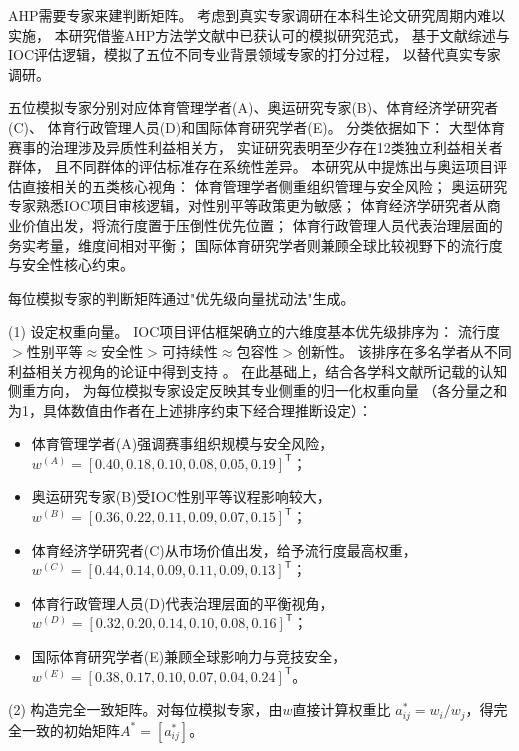 \documentclass[twoside]{CUGThesis}
\begin{document}
AHP需要专家来建判断矩阵。
考虑到真实专家调研在本科生论文研究周期内难以实施，
本研究借鉴AHP方法学文献中已获认可的模拟研究范式\cite{Zahedi1986,Carmone1997}，
基于文献综述与IOC评估逻辑，模拟了五位不同专业背景领域专家的打分过程，
以替代真实专家调研。

五位模拟专家分别对应体育管理学者(A)、奥运研究专家(B)、体育经济学研究者(C)、
体育行政管理人员(D)和国际体育研究学者(E)。
分类依据如下：
大型体育赛事的治理涉及异质性利益相关方，
实证研究表明至少存在12类独立利益相关者群体\cite{Parent2008}，
且不同群体的评估标准存在系统性差异。
本研究从中提炼出与奥运项目评估直接相关的五类核心视角：
体育管理学者侧重组织管理与安全风险；
奥运研究专家熟悉IOC项目审核逻辑，对性别平等政策更为敏感；
体育经济学研究者从商业价值出发，将流行度置于压倒性优先位置；
体育行政管理人员代表治理层面的务实考量，维度间相对平衡；
国际体育研究学者则兼顾全球比较视野下的流行度与安全性核心约束。

每位模拟专家的判断矩阵通过"优先级向量扰动法"生成\cite{Carmone1997,Zahedi1986}。

(1) 设定权重向量。
IOC项目评估框架\cite{IOC2023}确立的六维度基本优先级排序为：
流行度$>$性别平等$\approx$安全性$>$可持续性$\approx$包容性$>$创新性。
该排序在多名学者从不同利益相关方视角的论证中得到支持
\cite{Parent2008,Preuss2004,Chappelet2021,Preuss2021}。
在此基础上，结合各学科文献所记载的认知侧重方向，
为每位模拟专家设定反映其专业侧重的归一化权重向量
（各分量之和为1，具体数值由作者在上述排序约束下经合理推断设定）：

\begin{itemize}[nolistsep,leftmargin=*]
\item 体育管理学者(A)强调赛事组织规模与安全风险\cite{Parent2008}，
$w^{(A)}=[0.40,0.18,0.10,0.08,0.05,0.19]^{\mathsf{T}}$；
\item 奥运研究专家(B)受IOC性别平等议程影响较大\cite{Chappelet2021}，
$w^{(B)}=[0.36,0.22,0.11,0.09,0.07,0.15]^{\mathsf{T}}$；
\item 体育经济学研究者(C)从市场价值出发\cite{Preuss2004}，给予流行度最高权重，
$w^{(C)}=[0.44,0.14,0.09,0.11,0.09,0.13]^{\mathsf{T}}$；
\item 体育行政管理人员(D)代表治理层面的平衡视角\cite{Parent2008}，
$w^{(D)}=[0.32,0.20,0.14,0.10,0.08,0.16]^{\mathsf{T}}$；
\item 国际体育研究学者(E)兼顾全球影响力与竞技安全\cite{Preuss2021}，
$w^{(E)}=[0.38,0.17,0.10,0.07,0.04,0.24]^{\mathsf{T}}$。
\end{itemize}

(2) 构造完全一致矩阵。对每位模拟专家，由$w$直接计算权重比
$a_{ij}^*=w_i/w_j$，得完全一致的初始矩阵$A^*=[a_{ij}^*]$。
\end{document}
